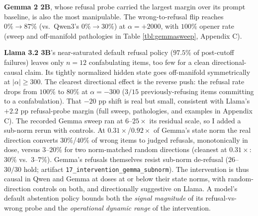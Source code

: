 \textbf{Gemma 2 2B}, whose refusal probe carried the largest margin
over its prompt baseline, is also the most manipulable. The
wrong-to-refusal flip reaches \(0\% \to 87\%\) (vs.~Qwen3's
\(0\% \to 30\%\)) at \(\alpha = +2000\), with \(100\%\)
opener rate (sweep and off-manifold pathologies in Table
\ref{tbl:gemmasweep}, Appendix C).

\textbf{Llama 3.2 3B}'s near-saturated default refusal policy
(\(97.5\%\) of post-cutoff failures) leaves only \(n=12\) confabulating
items, too few for a clean directional-causal claim. Its tightly
normalized hidden state goes off-manifold symmetrically at
\(|\alpha| \ge 300\). The clearest directional effect is the reverse push: the refusal rate drops from \(100\%\) to \(80\%\) at
\(\alpha = -300\) (\(3/15\) previously-refusing items committing to a
confabulation). That \(-20\) pp shift is real but small, consistent
with Llama's \(+2.2\) pp refusal-probe margin (full sweep, pathologies,
and examples in Appendix C). The recorded Gemma sweep ran at
\(6\)--\(25\times\) its residual scale, so I added a sub-norm rerun with
controls. At \(0.31\times\)/\(0.92\times\) of Gemma's state norm the
real direction converts \(30\%\)/\(40\%\) of wrong items to judged
refusals, monotonically in dose, versus \(3\)--\(20\%\) for two
norm-matched random directions (cleanest at \(0.31\times\): \(30\%\)
vs.\ \(3\)--\(7\%\)). Gemma's refusals themselves resist sub-norm
de-refusal (\(26\)--\(30/30\) hold; artifact
\texttt{17\_intervention\_gemma\_subnorm}). The intervention is thus
causal in Qwen and Gemma at doses at or below their state norms, with
random-direction controls on both, and directionally suggestive on
Llama. A model's default abstention policy bounds both the
\emph{signal magnitude} of its refusal-vs-wrong probe and the
\emph{operational dynamic range} of the intervention.
